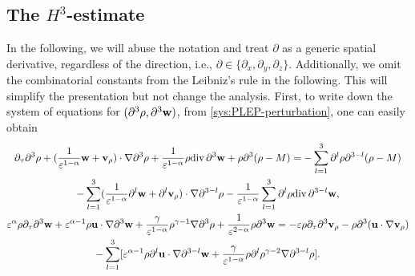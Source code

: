 \documentclass[11pt]{article}
\theoremstyle{plain}
\theoremstyle{definition}
\theoremstyle{remark}
\newcommand{\dtau}{\partial_\tau}
\newcommand{\dv}{\mathrm{div}\, }
\renewcommand{\vec}[1]{{\bf #1}}
\numberwithin{equation}{section}
\begin{document}
\subsection{The $ H^3 $-estimate}
\label{sec:h3-energy}

In the following, we will abuse the notation and treat $ \partial $ as a generic spatial derivative, regardless of the direction, i.e., $ \partial \in \lbrace \partial_x, \partial_y, \partial_z \rbrace $. Additionally, we omit the combinatorial constants from the Leibniz's rule in the following. This will simplify the presentation but not change the analysis. First, to write down the system of equations for $ (\partial^3 \rho, \partial^3 \vec w) $, from \eqref{sys:PLEP-perturbation}, one can easily obtain
\begin{subequations}
    \label{sys:PLEP-perturbation-ddd}
    \begin{gather}
        \label{eq:ptb-ddd-01}
        \begin{gathered}
            \dtau \partial^3 \rho + (\frac{1}{\varepsilon^{1-\alpha}}\vec w + \vec v_\rho) \cdot \nabla \partial^3 \rho + \frac{1}{\varepsilon^{1-\alpha}} \rho \dv \partial^3 \vec w  + \rho \partial^3 (\rho - M) = - \sum_{l = 1}^3 \partial^l \rho \partial^{3-l}(\rho - M) \\
            - \sum_{l=1}^{3} (\frac{1}{\varepsilon^{1-\alpha}} \partial^l \vec w + \partial^l \vec v_\rho) \cdot \nabla\partial^{3-l} \rho - \frac{1}{\varepsilon^{1-\alpha}} \sum_{l=1}^3 \partial^{l} \rho \dv \partial^{3-l}\vec w, 
        \end{gathered}\\
        \label{eq:ptb-ddd-02}
        \begin{gathered}
            \varepsilon^\alpha \rho \dtau \partial^3 \vec w + \varepsilon^{\alpha-1} \rho \vec u \cdot \nabla \partial^3 \vec w + \frac{\gamma}{\varepsilon^{1-\alpha}}  \rho^{\gamma-1} \nabla \partial^3 \rho + \frac{1}{\varepsilon^{2-\alpha}} \rho \partial^3 \vec w = - \varepsilon \rho \dtau \partial^3 \vec v_\rho - \rho \partial^3 (\vec u \cdot \nabla \vec v_\rho) \\
            - \sum_{l=1}^3 \lbrack \varepsilon^{\alpha-1} \rho \partial^l \vec u \cdot \nabla \partial^{3-l} \vec w + \frac{\gamma}{\varepsilon^{1-\alpha}} \rho \partial^l \rho^{\gamma-2} \nabla \partial^{3-l}\rho \rbrack. 
        \end{gathered}
    \end{gather}

\end{subequations}
\end{document}
